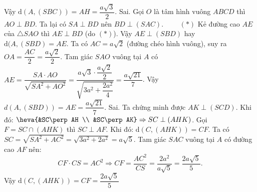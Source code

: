 \begin{ex}
{\begin{itemchoice}
    Vậy $\mathrm{d}(A,(SBC))=AH=\dfrac{a\sqrt{3}}{2}$.
   \itemch Sai. 
   Gọi $O$ là tâm hình vuông  $ABCD$ thì $AO\perp BD$.
    Ta lại có $SA\perp BD$ nên $BD\perp (SAC).$ $ \qquad (*)$
   Kẻ đường cao $AE$ của $\triangle SAO$ thì  $AE\perp BD$ (do $(*)$).
    Vậy $AE\perp (SBD)$ hay $\mathrm{d}(A,(SBD)=AE$.
   Ta có $AC=a\sqrt{2}$ (đường  chéo hình vuông), suy ra $OA=\dfrac{AC}{2}=\dfrac{a\sqrt{2}}{2}$.
   Tam giác $SAO$ vuông tại $A$ có $AE=\dfrac{SA\cdot AO}{\sqrt{SA^2+AO^2}}=\dfrac{a\sqrt{3} \cdot \dfrac{a\sqrt{2}}{2}}{\sqrt{3a^2+\dfrac{2a^2}{4}}}=\dfrac{a\sqrt{21}}{7}$. 
   Vậy $d(A,(SBD))=AE=\dfrac{a\sqrt{21}}{7}$. 
   \itemch  Sai.
   Ta chứng minh được $AK\perp (SCD)$. Khi đó:  $\heva {&SC\perp AH \\ &SC\perp AK} \Rightarrow SC\perp (AHK)$.
   Gọi $F=SC\cap  (AHK)$ thì $SC\perp AF$.
    Khi đó: $\mathrm{d}(C,(AHK))=CF$.
   Ta có $SC=\sqrt{SA^2+AC^2}=\sqrt{3a^2+2a^2}=a\sqrt{5}$. 
   Tam giác $SAC$ vuông tại $A$  có đường cao $AF$ nên:
   \[CF\cdot  CS=AC^2\Rightarrow CF=\dfrac{AC^2}{CS}=\dfrac{2a^2}{a\sqrt{5}}=\dfrac{2a\sqrt{5}}{5}.\]
   Vậy  $\mathrm{d}(C,(AHK))=CF=\dfrac{2a\sqrt{5}}{5}$
  \end{itemchoice}
 } 
\end{ex}


